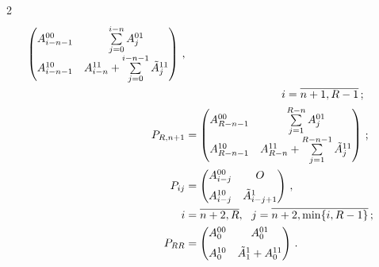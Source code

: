 \begin{multicols}{2}
\begin{align}
\begin{pmatrix}
A^{00}_{i-n-1} & \sum\limits_{j=0}^{i-n} A^{01}_{j}\\[6pt]


A^{10}_{i-n-1} & A^{11}_{i-n} + \sum\limits_{j=0}^{i-n-1} \Tilde A^{11}_{j}\\


\end{pmatrix}\,,\notag\\


&\ \ \ \ \ \ \ \ \ \hspace*{20mm} i=\overline{n+1,R-1}\,;\\


P_{R,n+1} &=


\begin{pmatrix}


A^{00}_{R-n-1} & \sum\limits_{j=1}^{R-n} A^{01}_{j}\\[6pt]


A^{10}_{R-n-1} & A^{11}_{R-n} + \sum\limits_{j=1}^{R-n-1} \Tilde A^{11}_{j}\\


\end{pmatrix}\,;


\\


P_{ij} &=


\begin{pmatrix}


A^{00}_{i-j} & O \\[6pt]


A^{10}_{i-j} & \Tilde A^{1}_{i-j+1} \\


\end{pmatrix}\,,\notag \\ 


 i&=\overline{n+2,R}, \ \ j=\overline{n+2,\min\{i,R-1\}}\,;


\\


P_{RR} &=


\begin{pmatrix}


A^{00}_{0} & A^{01}_{0}\\[6pt]


A^{10}_{0} & \Tilde A^{1}_{1}+A^{11}_{0}\\


\end{pmatrix}\,. \label{p_ij_RR}


\end{align}






\end{multicols}

